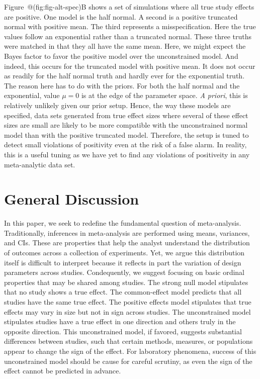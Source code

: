 \documentclass[english,man]{apa6}
\theoremstyle{definition}
\theoremstyle{definition}
\theoremstyle{definition}
\theoremstyle{remark}
\begin{document}
Figure~@(fig:fig-alt-spec)B shows a set of simulations where all true
study effects are positive. One model is the half normal. A second is a
positive truncated normal with positive mean. The third represents a
misspecification. Here the true values follow an exponential rather than
a truncated normal. These three truths were matched in that they all
have the same mean. Here, we might expect the Bayes factor to favor the
positive model over the unconstrained model. And indeed, this occurs for
the truncated model with positive mean. It does not occur as readily for
the half normal truth and hardly ever for the exponential truth. The
reason here has to do with the priors. For both the half normal and the
exponential, value \(\mu=0\) is at the edge of the parameter space.
\emph{A priori}, this is relatively unlikely given our prior setup.
Hence, the way these models are specified, data sets generated from true
effect sizes where several of these effect sizes are small are likely to
be more compatible with the unconstrained normal model than with the
positive truncated model. Therefore, the setup is tuned to detect small
violations of positivity even at the risk of a false alarm. In reality,
this is a useful tuning as we have yet to find any violations of
positiveity in any meta-analytic data set.

\section{General Discussion}\label{general-discussion}

In this paper, we seek to redefine the fundamental question of
meta-analysis. Traditionally, inferences in meta-analysis are performed
using means, variances, and CIs. These are properties that help the
analyst understand the distribution of outcomes across a collection of
experiments. Yet, we argue this distribution itself is difficult to
interpret because it reflects in part the variation of design parameters
across studies. Condequently, we suggest focusing on basic ordinal
properties that may be shared among studies. The strong null model
stipulates that no study shows a true effect. The common-effect model
predicts that all studies have the same true effect. The positive
effects model stipulates that true effects may vary in size but not in
sign across studies. The unconstrained model stipulates studies have a
true effect in one direction and others truly in the opposite direction.
This unconstrained model, if favored, suggests substantial differences
between studies, such that certain methods, measures, or populations
appear to change the sign of the effect. For laboratory phenomena,
success of this unconstrained model should be cause for careful
scrutiny, as even the sign of the effect cannot be predicted in advance.
\end{document}
